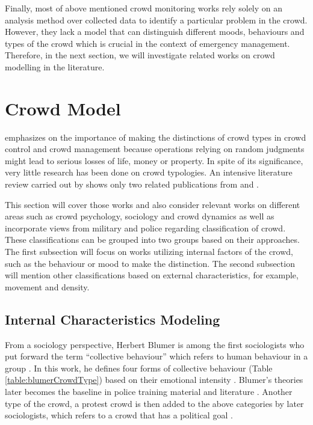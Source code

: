 Finally, most of above mentioned crowd monitoring works rely solely on an analysis method over collected data to identify a particular problem in the crowd. However, they lack a model that can distinguish different moods, behaviours and types of the crowd which is crucial in the context of emergency management. Therefore, in the next section, we will investigate related works on crowd modelling in the literature.

\section{Crowd Model}
\citet{Berlonghi1995} emphasizes on the importance of making the distinctions of crowd types in crowd control and crowd management because operations relying on random judgments might lead to serious losses of life, money or property. In spite of its significance, very little research has been done on crowd typologies. An intensive literature review carried out by \citet{Challenger2009} shows only two related publications from \citet{Momboisse1967} and \citet{Berlonghi1995}.

This section will cover those works and also consider relevant works on different areas such as crowd psychology, sociology and crowd dynamics as well as incorporate views from military and police regarding classification of crowd. These classifications can be grouped into two groups based on their approaches. The first subsection will focus on works utilizing internal factors of the crowd, such as the behaviour or mood to make the distinction. The second subsection will mention other classifications based on external characteristics, for example, movement and density.

\subsection{Internal Characteristics Modeling}

From a sociology perspective, Herbert Blumer is among the first sociologists who put forward the term ``collective behaviour'' which refers to human behaviour in a group \citep{Blumer1951}. In this work, he defines four forms of collective behaviour (Table \ref{table:blumerCrowdType}) based on their emotional intensity \citep{Imhonopi2013}. Blumer’s theories later becomes the baseline in police training material and literature \citep{Schweingruber2000}. Another type of the crowd, a protest crowd is then added to the above categories by later sociologists, which refers to a crowd that has a political goal \citep{Imhonopi2013}.

